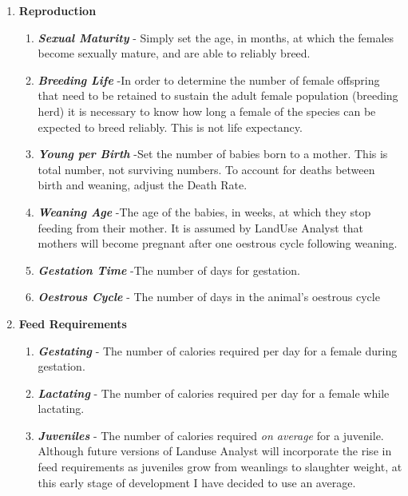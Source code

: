 \begin{enumerate}
    \item \textbf{Reproduction}
      \begin{enumerate}
        \item  \textit{\textbf{Sexual Maturity}} - Simply set the age, in
months, at which the females become sexually mature, and are able to reliably
breed.
        \item  \textit\textbf{{Breeding Life}} -In order to determine the number
of female offspring that need to be retained to sustain the adult female
population (breeding herd) it is necessary to know how long a female of the
species can be expected to breed reliably. This is not life expectancy. 
        \item  \textit{\textbf{Young per Birth}} -Set the number of babies born
to a mother. This is total number, not surviving numbers. To account for deaths
between birth and weaning, adjust the Death Rate. 
        \item  \textit{\textbf{Weaning Age}} -The age of the babies, in weeks,
at which they stop feeding from their mother. It is assumed by LandUse Analyst
that mothers will become pregnant after one oestrous cycle following weaning. 
        \item  \textit{\textbf{Gestation Time}} -The number of days for
gestation. 
        \item  \textit{\textbf{Oestrous Cycle}} - The number of days in the
animal's oestrous cycle

      \end{enumerate}

    \item \textbf{Feed Requirements}
      \begin{enumerate}
        \item  \textit{\textbf{Gestating}} - The number of calories required per
day for a female during gestation.
        \item  \textit{\textbf{Lactating}} - The number of calories required per
day for a female while lactating.
        \item  \textit{\textbf{Juveniles}} - The number of calories required
\textit{on average} for a juvenile.  Although future versions of Landuse Analyst
will incorporate the rise in feed requirements as juveniles grow from weanlings
to slaughter weight, at this early stage of development I have decided to use an
average.
      \end{enumerate}
  \end{enumerate}

